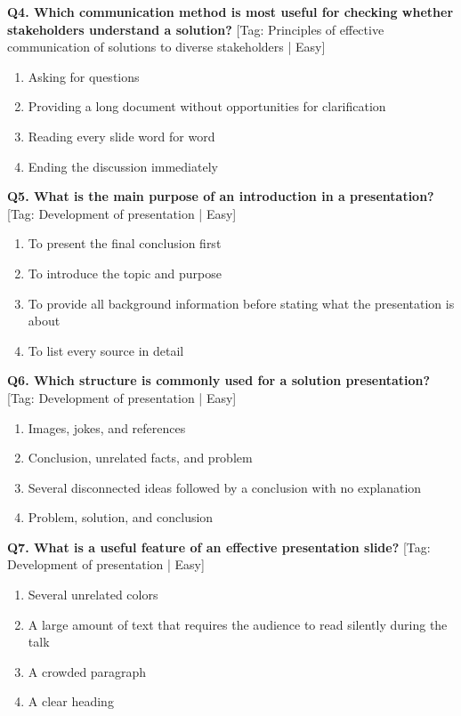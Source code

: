 \noindent\textbf{Q4. Which communication method is most useful for checking whether stakeholders understand a solution?} \hfill [Tag: Principles of effective communication of solutions to diverse stakeholders | Easy]
\begin{enumerate}[label=(\alph*),topsep=2pt,itemsep=1pt,partopsep=0pt,parsep=0pt]
    \item {Asking for questions}
    \item {Providing a long document without opportunities for clarification}
    \item {Reading every slide word for word}
    \item {Ending the discussion immediately}
\end{enumerate}
\vspace{2mm}

\noindent\textbf{Q5. What is the main purpose of an introduction in a presentation?} \hfill [Tag: Development of presentation | Easy]
\begin{enumerate}[label=(\alph*),topsep=2pt,itemsep=1pt,partopsep=0pt,parsep=0pt]
    \item {To present the final conclusion first}
    \item {To introduce the topic and purpose}
    \item {To provide all background information before stating what the presentation is about}
    \item {To list every source in detail}
\end{enumerate}
\vspace{2mm}

\noindent\textbf{Q6. Which structure is commonly used for a solution presentation?} \hfill [Tag: Development of presentation | Easy]
\begin{enumerate}[label=(\alph*),topsep=2pt,itemsep=1pt,partopsep=0pt,parsep=0pt]
    \item {Images, jokes, and references}
    \item {Conclusion, unrelated facts, and problem}
    \item {Several disconnected ideas followed by a conclusion with no explanation}
    \item {Problem, solution, and conclusion}
\end{enumerate}
\vspace{2mm}

\noindent\textbf{Q7. What is a useful feature of an effective presentation slide?} \hfill [Tag: Development of presentation | Easy]
\begin{enumerate}[label=(\alph*),topsep=2pt,itemsep=1pt,partopsep=0pt,parsep=0pt]
    \item {Several unrelated colors}
    \item {A large amount of text that requires the audience to read silently during the talk}
    \item {A crowded paragraph}
    \item {A clear heading}
\end{enumerate}
\vspace{2mm}

